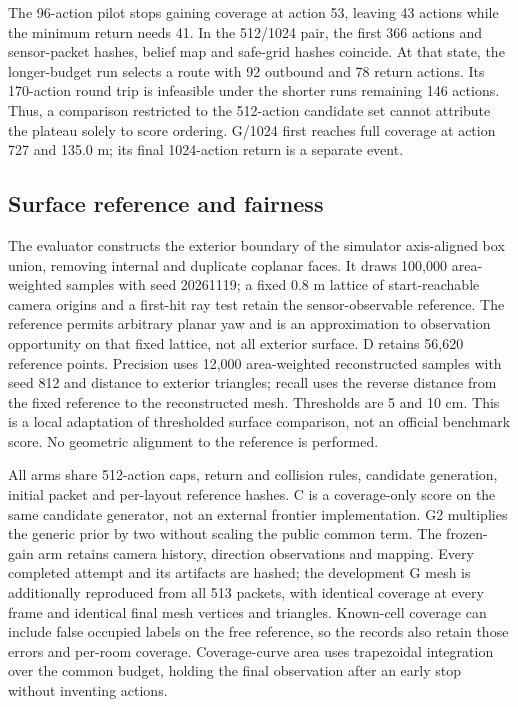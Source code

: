 The 96-action pilot stops gaining coverage at action 53, leaving 43 actions while the minimum return needs 41. In the 512/1024 pair, the first 366 actions and sensor-packet hashes, belief map and safe-grid hashes coincide. At that state, the longer-budget run selects a route with 92 outbound and 78 return actions. Its 170-action round trip is infeasible under the shorter run\textquotesingle s remaining 146 actions. Thus, a comparison restricted to the 512-action candidate set cannot attribute the plateau solely to score ordering. G/1024 first reaches full coverage at action 727 and 135.0 m; its final 1024-action return is a separate event.

\subsection{Surface reference and fairness}

The evaluator constructs the exterior boundary of the simulator axis-aligned box union, removing internal and duplicate coplanar faces. It draws 100,000 area-weighted samples with seed 20261119; a fixed 0.8 m lattice of start-reachable camera origins and a first-hit ray test retain the sensor-observable reference. The reference permits arbitrary planar yaw and is an approximation to observation opportunity on that fixed lattice, not all exterior surface. D retains 56,620 reference points. Precision uses 12,000 area-weighted reconstructed samples with seed 812 and distance to exterior triangles; recall uses the reverse distance from the fixed reference to the reconstructed mesh. Thresholds are 5 and 10 cm. This is a local adaptation of thresholded surface comparison, not an official benchmark score. No geometric alignment to the reference is performed.

All arms share 512-action caps, return and collision rules, candidate generation, initial packet and per-layout reference hashes. C is a coverage-only score on the same candidate generator, not an external frontier implementation. G2 multiplies the generic prior by two without scaling the public common term. The frozen-gain arm retains camera history, direction observations and mapping. Every completed attempt and its artifacts are hashed; the development G mesh is additionally reproduced from all 513 packets, with identical coverage at every frame and identical final mesh vertices and triangles. Known-cell coverage can include false occupied labels on the free reference, so the records also retain those errors and per-room coverage. Coverage-curve area uses trapezoidal integration over the common budget, holding the final observation after an early stop without inventing actions.

